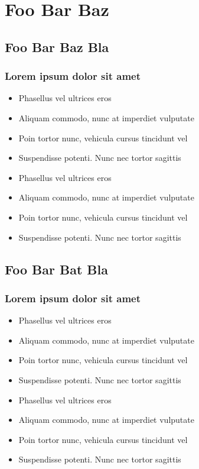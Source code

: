 \section{Foo Bar Baz}

\subsection{Foo Bar Baz Bla}

\frame
{
  \frametitle{Lorem ipsum dolor sit amet}
  \begin{itemize}
    \item{Phasellus vel ultrices eros}
    \item{Aliquam commodo, nunc at imperdiet vulputate}
    \item{Poin tortor nunc, vehicula cursus tincidunt vel}
    \item{Suspendisse potenti. Nunc nec tortor sagittis}
    \item{Phasellus vel ultrices eros}
    \item{Aliquam commodo, nunc at imperdiet vulputate}
    \item{Poin tortor nunc, vehicula cursus tincidunt vel}
    \item{Suspendisse potenti. Nunc nec tortor sagittis}
  \end{itemize}
}

\subsection{Foo Bar Bat Bla}

\frame
{
  \frametitle{Lorem ipsum dolor sit amet}
  \begin{itemize}
    \item{Phasellus vel ultrices eros}
    \item{Aliquam commodo, nunc at imperdiet vulputate}
    \item{Poin tortor nunc, vehicula cursus tincidunt vel}
    \item{Suspendisse potenti. Nunc nec tortor sagittis}
    \item{Phasellus vel ultrices eros}
    \item{Aliquam commodo, nunc at imperdiet vulputate}
    \item{Poin tortor nunc, vehicula cursus tincidunt vel}
    \item{Suspendisse potenti. Nunc nec tortor sagittis}
  \end{itemize}
}


